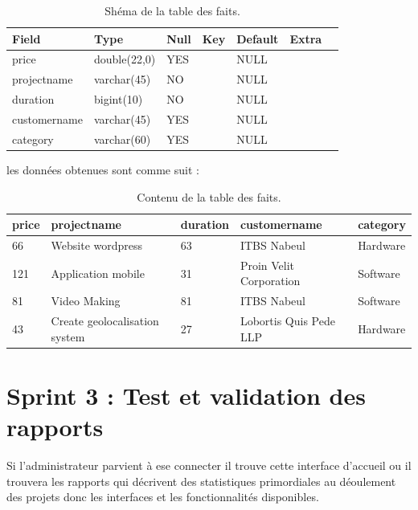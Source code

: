 \begin{table}

\begin{tabular}{|l|l|l|l|l|l|l|}
\hline
 \textbf{Field}        & \textbf{Type}         & \textbf{Null} & \textbf{Key}  & \textbf{Default} & \textbf{Extra}   \\
\hline
price        & double(22,0) & YES  &     & NULL    &         \\
\hline
projectname  & varchar(45)  & NO   &     & NULL    &         \\
\hline
duration     & bigint(10)   & NO   &     & NULL    &         \\
\hline
customername & varchar(45)  & YES  &     & NULL    &         \\
\hline
category     & varchar(60)  & YES  &     & NULL    &         \\
\hline
\end{tabular}
\centering
\caption{Sh\'{e}ma de la table des faits.}
\end{table}



les donn\'{e}es obtenues sont comme suit :

\begin{table}

\begin{tabular}{|l|l|l|l|l|}
\hline
\textbf{price} & \textbf{projectname}                   & \textbf{duration} & \textbf{customername}            & \textbf{category}  \\
\hline
66    & Website wordpress             & 63       & ITBS Nabeul             & Hardware  \\
\hline
121   & Application mobile            & 31       & Proin Velit Corporation & Software  \\
\hline
81    & Video Making                  & 81       & ITBS Nabeul             & Software  \\
\hline
43    & Create geolocalisation system & 27       & Lobortis Quis Pede LLP  & Hardware  \\
\hline
\end{tabular}
\centering
\caption{Contenu de la table des faits.}
\end{table}


\section{Sprint 3 : Test et validation des rapports}


Si l'administrateur parvient \`{a} ese connecter il trouve cette interface d'accueil
ou il trouvera les rapports qui d\'{e}crivent des statistiques primordiales au
d\'{e}oulement des projets donc les interfaces et les fonctionnalit\'{e}s disponibles.

